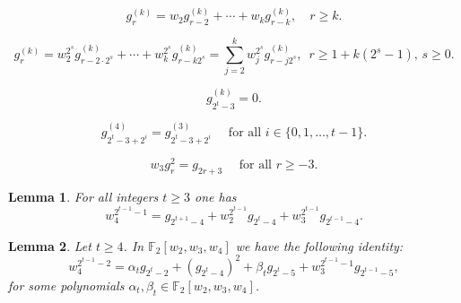 \documentclass[10pt,a4paper]{amsart}
\newtheorem{lemma}{Lemma}
\newcommand{\F}{\mathbb F}
\renewcommand{\ge}{\geqslant}
\begin{document}
	\begin{equation}\label{eq_rec_g}
		g_r^{(k)} =   w_2 g_{r-2}^{(k)} + \cdots +   w_k g_{r-k}^{(k)}, \quad r\ge k.
	\end{equation}

	\begin{equation}\label{eq_rec_g_gen}
		g_r^{(k)} \!=  w_2^{2^s} g_{r-2\cdot 2^s}^{(k)} + \cdots +   w_k^{2^s} g_{r-k2^s}^{(k)}=\!\sum_{j=2}^kw_j^{2^s} g_{r-j2^s}^{(k)}, \,\,\, r\geqslant1+k(2^s-1),\, s\geqslant0.
	\end{equation}

\begin{equation}\label{eq:g=0}
g_{2^t-3}^{(k)} = 0.
\end{equation}

\begin{equation}\label{3=4}
g_{2^t-3+2^i}^{(4)}=g_{2^t-3+2^i}^{(3)} \quad \mbox{ for all } i\in\{0,1,\ldots,t-1\}.
    \end{equation}

\begin{equation}\label{w_3kvadrat}
    w_3g_r^2=g_{2r+3} \quad \mbox{ for all } r\ge-3.
\end{equation}

\begin{lemma} \label{lem:rel-2^(t+1)}
For all integers $t\ge3$ one has
    \[w_4^{2^{t-1}-1}=g_{2^{t+1}-4}+w_2^{2^{t-1}}g_{2^t-4} + w_3^{2^{t-1}}g_{2^{t-1}-4}.\]
\end{lemma}

\begin{lemma}\label{lem: uzas1}
    Let $t \ge 4$. In $\F_2[w_2,w_3,w_4]$ we have the following identity:
    \[w_4^{2^{t-1}-2} = \alpha_tg_{2^t-2}+ (g_{2^t-4})^2 + \beta_tg_{2^t-5}  + w_3^{2^{t-1}-1}  g_{2^{t-1} - 5},\] 
    for some polynomials $\alpha_t,\beta_t\in\F_2[w_2,w_3,w_4]$.
\end{lemma}
\end{document}

